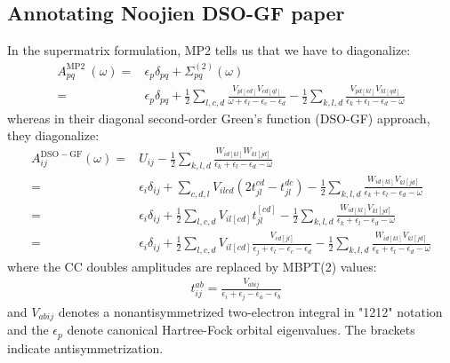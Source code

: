 \subsection{Annotating Noojien DSO-GF paper}
In the supermatrix formulation, MP2 tells us that we have to diagonalize:
\begin{align}
A_{p q}^{\text {MP2 }}(\omega)= & \epsilon_{p} \delta_{p q}+\Sigma_{p q}^{(2)}(\omega) \\
= & \epsilon_{p} \delta_{p q}+\frac{1}{2} \sum_{l, c, d} \frac{V_{p l[c d]} V_{c d[q l]}}{\omega+\epsilon_{l}-\epsilon_{c}-\epsilon_{d}}
-\frac{1}{2} \sum_{k, l, d} \frac{V_{p d[k l]} V_{k l[q d]}}{\epsilon_{k}+\epsilon_{l}-\epsilon_{d}-\omega}
\end{align}
whereas in their diagonal second-order Green's function (DSO-GF) approach, they diagonalize:
\begin{align}
A_{i j}^{\mathrm{DSO}-\mathrm{GF}}(\omega)=& U_{i j}-\frac{1}{2} \sum_{k, l, d} \frac{W_{i d[k l]} W_{k l[j d]}}{\epsilon_{k}+\epsilon_{l}-\epsilon_{d}-\omega} \\
= & \epsilon_{i} \delta_{ij}+\sum_{c, d, l} V_{i l c d}\left(2 t_{j l}^{c d}-t_{j l}^{d c}\right) -\frac{1}{2} \sum_{k, l, d} \frac{W_{i d[k l]} V_{k l[j d]}}{\epsilon_{k}+\epsilon_{l}-\epsilon_{d}-\omega} \\
= & \epsilon_{i} \delta_{i j}+\frac{1}{2} \sum_{l, c, d} V_{i l[c d]} t_{j l}^{[c d]}  -\frac{1}{2} \sum_{k, l, d} \frac{W_{i d[k l]} V_{k l[j d]}}{\epsilon_{k}+\epsilon_{l}-\epsilon_{d}-\omega} \\
= & \epsilon_{i} \delta_{i j}+\frac{1}{2} \sum_{l, c, d} V_{i l[c d]} \frac{V_{c d[j l]}}{\epsilon_{j}+\epsilon_{l}-\epsilon_{c}-\epsilon_{d}} -\frac{1}{2} \sum_{k, l, d} \frac{W_{i d[k l]} V_{k l[j d]}}{\epsilon_{k}+\epsilon_{l}-\epsilon_{d}-\omega}
\end{align}
where the CC doubles amplitudes are replaced by MBPT(2) values:
\begin{align*}
& t_{i j}^{a b}=\frac{V_{a b i j}}{\epsilon_{i}+\epsilon_{j}-\epsilon_{a}-\epsilon_{b}}
\end{align*}
and $V_{a b i j}$ denotes a nonantisymmetrized two-electron integral in "1212" notation and the $\epsilon_{p}$ denote canonical Hartree-Fock orbital eigenvalues. The brackets indicate antisymmetrization. 

